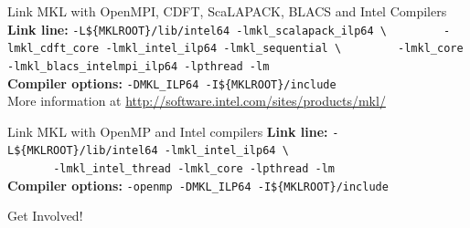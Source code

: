 \documentclass[final,t]{beamer}
\begin{document}
\begin{frame}[fragile]{}
\begin{columns}[t]
\begin{column}{.32\linewidth}
      \begin{block}{Link MKL with OpenMPI, CDFT, ScaLAPACK, BLACS and Intel Compilers}
      \textbf{Link line:} \verb|-L${MKLROOT}/lib/intel64 -lmkl_scalapack_ilp64 \|
      \verb|        -lmkl_cdft_core -lmkl_intel_ilp64 -lmkl_sequential \|
      \verb|        -lmkl_core -lmkl_blacs_intelmpi_ilp64 -lpthread -lm|\\
      \textbf{Compiler options: }      \verb|-DMKL_ILP64 -I${MKLROOT}/include|\\
      More information at \url{http://software.intel.com/sites/products/mkl/}
      \end{block}
 
 
      \begin{block}{Link MKL with OpenMP and Intel compilers}
      \textbf{Link line:} \verb|-L${MKLROOT}/lib/intel64 -lmkl_intel_ilp64 \|\\
      \verb|       -lmkl_intel_thread -lmkl_core -lpthread -lm|\\
      \textbf{Compiler options: } \verb|-openmp -DMKL_ILP64 -I${MKLROOT}/include|
      \end{block}
 
 
      \begin{block}{Get Involved!}
      \end{block}
 

\end{column}
\end{columns}
\end{frame}
\end{document}
